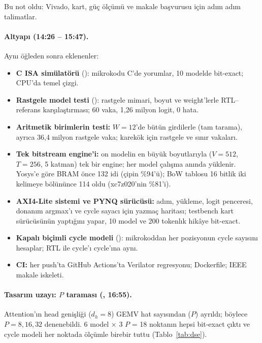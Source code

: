 
Bu not  oldu: Vivado, kart, güç ölçümü ve makale başvurusu için adım adım talimatlar.

\paragraph{Altyapı (14:26 – 15:47).} Aynı öğleden sonra eklenenler:
\begin{itemize}
  \item \textbf{C ISA simülatörü} (): mikrokodu C'de yorumlar, 10 modelde bit-exact; CPU'da temel çizgi.
  \item \textbf{Rastgele model testi} (): rastgele mimari, boyut ve weight'lerle RTL–referans karşılaştırması; 60 vaka, 1,26 milyon logit, 0 hata.
  \item \textbf{Aritmetik birimlerin testi:}  $W=12$'de bütün girdilerle (tam tarama), ayrıca 36,4 milyon rastgele vaka; karekök için rastgele ve sınır vakaları.
  \item \textbf{Tek bitstream engine'i:} on modelin en büyük boyutlarıyla ($V=512$, $T=256$, 5 katman) tek bir engine; her model çalışma anında yüklenir. Yosys'e göre BRAM önce 132 idi (çipin \%94'ü); BoW tablosu 16 bitlik iki kelimeye bölününce 114 oldu (xc7z020'nin \%81'i).
  \item \textbf{AXI4-Lite sistemi ve PYNQ sürücüsü:} adım, yükleme, logit penceresi, donanım argmax'ı ve cycle sayacı için yazmaç haritası; testbench kart sürücüsünün yaptığını yapar, 10 model ve 200 tokenlık hikâye bit-exact.
  \item \textbf{Kapalı biçimli cycle modeli} (): mikrokoddan her pozisyonun cycle sayısını hesaplar; RTL ile cycle'ı cycle'ına aynı.
  \item \textbf{CI:} her push'ta GitHub Actions'ta Verilator regresyonu; Dockerfile; IEEE makale iskeleti.
\end{itemize}

\paragraph{Tasarım uzayı: $P$ taraması (, 16:55).} Attention'ın head genişliği ($d_h = 8$) GEMV hat sayısından ($P$) ayrıldı; böylece $P = 8, 16, 32$ denenebildi. 6 model × 3 $P$ = 18 noktanın hepsi bit-exact çıktı ve cycle modeli her noktada ölçümle birebir tuttu (Tablo~\ref{tab:dse}).

